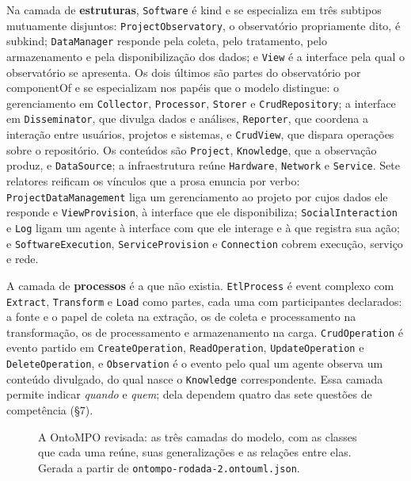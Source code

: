 Na camada de \textbf{estruturas}, \texttt{Software} é \guillemotleft{}kind\guillemotright{} e se especializa em três subtipos mutuamente disjuntos: \texttt{ProjectObservatory}, o observatório propriamente dito, é \guillemotleft{}subkind\guillemotright{}; \texttt{DataManager} responde pela coleta, pelo tratamento, pelo armazenamento e pela disponibilização dos dados; e \texttt{View} é a interface pela qual o observatório se apresenta. Os dois últimos são partes do observatório por \guillemotleft{}componentOf\guillemotright{} e se especializam nos papéis que o modelo distingue: o gerenciamento em \texttt{Collector}, \texttt{Processor}, \texttt{Storer} e \texttt{CrudRepository}; a interface em \texttt{Disseminator}, que divulga dados e análises, \texttt{Reporter}, que coordena a interação entre usuários, projetos e sistemas, e \texttt{CrudView}, que dispara operações sobre o repositório. Os conteúdos são \texttt{Project}, \texttt{Knowledge}, que a observação produz, e \texttt{DataSource}; a infraestrutura reúne \texttt{Hardware}, \texttt{Network} e \texttt{Service}. Sete relatores reificam os vínculos que a prosa enuncia por verbo: \texttt{ProjectDataManagement} liga um gerenciamento ao projeto por cujos dados ele responde e \texttt{ViewProvision}, à interface que ele disponibiliza; \texttt{SocialInteraction} e \texttt{Log} ligam um agente à interface com que ele interage e à que registra sua ação; e \texttt{SoftwareExecution}, \texttt{ServiceProvision} e \texttt{Connection} cobrem execução, serviço e rede.

A camada de \textbf{processos} é a que não existia. \texttt{EtlProcess} é \guillemotleft{}event\guillemotright{} complexo com \texttt{Extract}, \texttt{Transform} e \texttt{Load} como partes, cada uma com participantes declarados: a fonte e o papel de coleta na extração, os de coleta e processamento na transformação, os de processamento e armazenamento na carga. \texttt{CrudOperation} é evento partido em \texttt{CreateOperation}, \texttt{ReadOperation}, \texttt{UpdateOperation} e \texttt{DeleteOperation}, e \texttt{Observation} é o evento pelo qual um agente observa um conteúdo divulgado, do qual nasce o \texttt{Knowledge} correspondente. Essa camada permite indicar \textit{quando} e \textit{quem}; dela dependem quatro das sete questões de competência (\S{}7).

\begin{figure}[H]
\centering

\caption{A OntoMPO revisada: as três camadas do modelo, com as classes que cada
uma reúne, suas generalizações e as relações entre elas. Gerada a partir de
\texttt{ontompo-rodada-2.ontouml.json}.}
\label{fig:integrado}
\end{figure}

